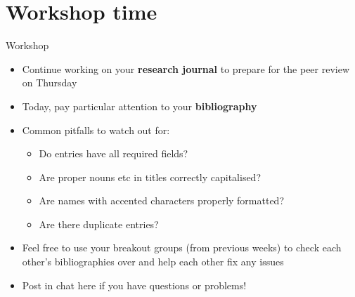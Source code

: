 \part{Workshop time}
\frame{\partpage}

\begin{frame}{Workshop}
    \begin{itemize}
        \item Continue working on your \textbf{research journal} to prepare for the peer review on Thursday
        \item Today, pay particular attention to your \textbf{bibliography}
        \item Common pitfalls to watch out for:
        \begin{itemize}
            \item Do entries have all required fields?
            \item Are proper nouns etc in titles correctly capitalised?
            \item Are names with accented characters properly formatted?
            \item Are there duplicate entries?
        \end{itemize}
        \item Feel free to use your breakout groups (from previous weeks) to check each other's bibliographies over and help each other fix any issues
        \item Post in chat here if you have questions or problems!
    \end{itemize}
\end{frame}


